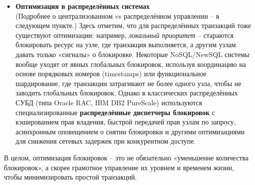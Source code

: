 \begin{itemize}
    \item \textbf{Оптимизация в распределённых системах} ~\\
    (Подробнее о централизованном vs распределённом управлении – в следующем пункте.) 
    Здесь отметим, что для распределённых транзакций тоже существуют оптимизации: например, \textit{локальный приоритет} – стараются блокировать ресурс на узле, где транзакция выполняется, а другим узлам давать только «сигналы» о блокировке. Некоторые NoSQL/NewSQL системы вообще уходят от явных глобальных блокировок, используя координацию на основе порядковых номеров (timestamps) или функциональное шардирование, где транзакции затрагивают не более одного узла, чтобы не заводить глобальных блокировок. Однако в классических распределённых СУБД (типа Oracle RAC, IBM DB2 PureScale) используются специализированные \textbf{распределённые диспетчеры блокировок} с кэшированием прав владения, быстрой передачей прав узлам по запросу, асинхронным оповещением о снятии блокировки и другими оптимизациями для снижения сетевых задержек при конкурентном доступе.
 \end{itemize} 
 В целом, оптимизация блокировок – это не обязательно «уменьшение количества блокировок», а скорее грамотное управление их уровнем и временем жизни, чтобы минимизировать простой транзакций.


